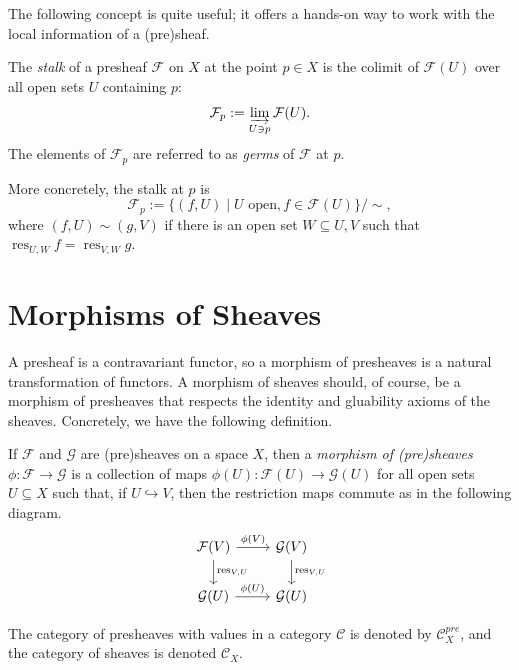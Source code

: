 \documentclass[11pt,openany]{book} %
\begin{document}
The following concept is quite useful; it offers a hands-on way to work with the local information of a (pre)sheaf.\\

\begin{definition}
The \emph{stalk} of a presheaf $\mathcal{F}$ on $X$ at the point $p \in X$ is the colimit of $\mathcal{F}(U)$ over all open sets $U$ containing $p$:
\[
	\mathcal{F}_p := \varinjlim_{U \ni p} \mathcal{F}(U).
\]
The elements of $\mathcal{F}_p$ are referred to as \emph{germs} of $\mathcal{F}$ at $p$.
\end{definition}

More concretely, the stalk at $p$ is
\[
	\mathcal{F}_p := \{(f,U) \mid U \text{ open}, f \in \mathcal{F}(U)\}/\sim,
\]
where $(f,U) \sim (g,V)$ if there is an open set $W \subseteq U,V$ such that $\operatorname{res}_{U,W} f = \operatorname{res}_{V,W} g$.


\section{Morphisms of Sheaves}
A presheaf is a contravariant functor, so a morphism of presheaves is a natural transformation of functors. A morphism of sheaves should, of course, be a morphism of presheaves that respects the identity and gluability axioms of the sheaves. Concretely, we have the following definition.\\

\begin{definition}
If $\mathcal{F}$ and $\mathcal{G}$ are (pre)sheaves on a space $X$, then a \emph{morphism of (pre)sheaves} $\phi : \mathcal{F} \to \mathcal{G}$ is a collection of maps $\phi(U) : \mathcal{F}(U) \to \mathcal{G}(U)$ for all open sets $U \subseteq X$ such that, if $U \hookrightarrow V$, then the restriction maps commute as in the following diagram.
\[
\begin{tikzcd}
	\mathcal{F}(V) \arrow[d, "\operatorname{res}_{V,U}"] \arrow[r, "\phi(V)"] & \mathcal{G}(V)
    \arrow[d, "\operatorname{res}_{V,U}"] \\
    \mathcal{G}(U) \arrow[r, "\phi(U)"] & \mathcal{G}(U)
\end{tikzcd}
\]

The category of presheaves with values in a category $\mathcal{C}$ is denoted by $\mathcal{C}_X^{pre}$, and the category of sheaves is denoted $\mathcal{C}_X$.
\end{definition}
\end{document}
